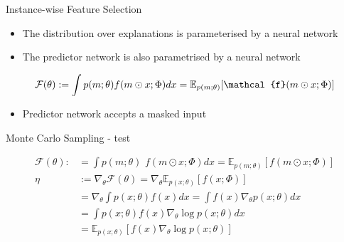 \documentclass[11pt,compress,t,notes=noshow, aspectratio=169, xcolor=table]{beamer}
\begin{document}
	
\begin{frame}{Instance-wise Feature Selection}
\begin{itemize}
    \item The distribution over explanations is parameterised by a neural network
    \item The predictor network is also parametrised by a neural network
\end{itemize}
\bigskip
\begin{equation*}
             \centering
        \mathcal{F}(\theta):= \int p(m;\theta) f(m\odot x;\Phi)dx = \mathbb{E}_{p(m;\theta)}[\mathcal{f}(m\odot x;\Phi)]
\end{equation*}

\bigskip

\begin{itemize}
    \item Predictor network accepts a masked input
\end{itemize}
\end{frame}

\begin{frame}{Monte Carlo Sampling - test}
 
 \begin{align*}
        \mathcal{F}(\theta):&= \int p(m;\theta)\,\,f(m\odot x;\Phi)dx = \mathbb{E}_{p(m;\theta)}[ f(m\odot x;\Phi)]\\
    \eta &:= \nabla_\theta \mathcal{F}(\theta) = \nabla_\theta \mathbb{E}_{p(x;\theta)}[f(x;\Phi)]\\
    &= \nabla_\theta \int p(x;\theta)f(x)dx=\int f(x)\nabla_\theta p(x;\theta)dx\\
    
    &=\int p(x;\theta)f(x)\nabla_\theta \log p(x;\theta)dx\\
    &=\mathbb{E}_{p(x;\theta)}[f(x)\nabla_\theta \log p(x;\theta)] 
\end{align*}


\end{frame}
\end{document}
